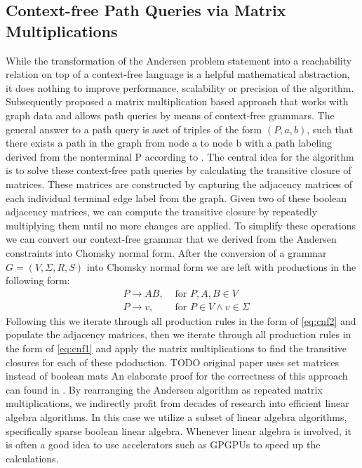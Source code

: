 \subsection{Context-free Path Queries via Matrix Multiplications}
While the transformation of the Andersen problem statement into a reachability relation on top of a context-free language is a helpful mathematical abstraction, it does nothing to improve performance, scalability or precision of the algorithm.
Subsequently \cite{azimov2018context} proposed a matrix multiplication based approach that works with graph data and allows path queries by means of context-free grammars.
The general answer to a path query is aset of triples of the form $(P,a,b)$, such that there exists a path in the graph from node a to node b with a path labeling derived from the nonterminal P according to \cite{azimov2018context}.
The central idea for the algorithm is to solve these context-free path queries by calculating the transitive closure of matrices. These matrices are constructed by capturing the adjacency matrices of each individual terminal edge label from the graph. Given two of these boolean adjacency matrices, we can compute the transitive closure by repeatedly multiplying them until no more changes are applied.
To simplify these operations we can convert our context-free grammar that we derived from the Andersen constraints into Chomsky normal form.
After the conversion of a grammar $G=(V,\Sigma,R,S)$ into Chomsky normal form we are left with productions in the following form:
\begin{align}
     & P\rightarrow AB, & \textrm{ for } P,A,B \in V \label{eq:cnf1}               \\
     & P\rightarrow v,  & \textrm{ for } P \in V \land v\in \Sigma \label{eq:cnf2}
\end{align}
Following this we iterate through all production rules in the form of \autoref{eq:cnf2} and populate the adjacency matrices, then we iterate through all production rules in the form of \autoref{eq:cnf1} and apply the matrix multiplications to find the transitive closures for each of these pdoduction.
TODO original paper uses set matrices instead of boolean mats
An elaborate proof for the correctness of this approach can found in \cite{azimov2018context}.
By rearranging the Andersen algorithm as repeated matrix multiplications, we indirectly profit from decades of research into efficient linear algebra algorithms.
In this case we utilize a subset of linear algebra algorithms, specifically sparse boolean linear algebra.
Whenever linear algebra is involved, it is often a good idea to use accelerators such as GPGPUs to speed up the calculations.


